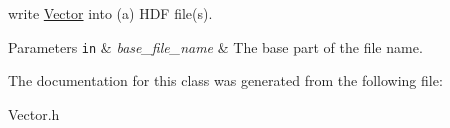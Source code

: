 write \hyperlink{class_c_a_r_o_m_1_1_vector}{Vector} into (a) H\-D\-F file(s). 


\begin{DoxyParams}[1]{Parameters}
\mbox{\tt in}  & {\em base\-\_\-file\-\_\-name} & The base part of the file name. \\
\hline
\end{DoxyParams}


The documentation for this class was generated from the following file\-:\begin{DoxyCompactItemize}
\item 
Vector.\-h\end{DoxyCompactItemize}
